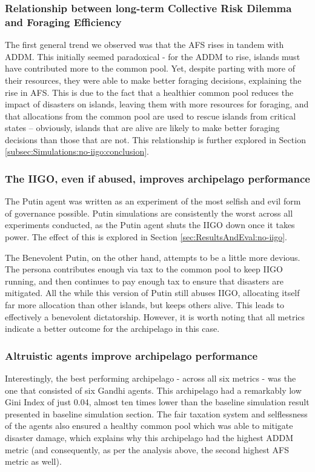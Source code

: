 \subsubsection{Relationship between long-term Collective Risk Dilemma and Foraging Efficiency}
The first general trend we observed was that the AFS rises in tandem with ADDM. This initially seemed paradoxical - for the ADDM to rise, islands must have contributed more to the common pool. Yet, despite parting with more of their resources, they were able to make better foraging decisions, explaining the rise in AFS. This is due to the fact that a healthier common pool reduces the impact of disasters on islands, leaving them with more resources for foraging, and that allocations from the common pool are used to rescue islands from critical states -- obviously, islands that are alive are likely to make better foraging decisions than those that are not. This relationship is further explored in Section \ref{subsec:Simulations:no-iigo:conclusion}.

\subsubsection{The IIGO, even if abused, improves archipelago performance}
The Putin agent was written as an experiment of the most selfish and evil form of governance possible. Putin simulations are consistently the worst across all experiments conducted, as the Putin agent shuts the IIGO down once it takes power. The effect of this is explored in Section \ref{sec:ResultsAndEval:no-iigo}. 

The Benevolent Putin, on the other hand, attempts to be a little more devious. The persona contributes enough via tax to the common pool to keep IIGO running, and then continues to pay enough tax to ensure that disasters are mitigated. All the while this version of Putin still abuses IIGO, allocating itself far more allocation than other islands, but keeps others alive. This leads to effectively a benevolent dictatorship. However, it is worth noting that all metrics indicate a better outcome for the archipelago in this case.

\subsubsection{Altruistic agents improve archipelago performance}

Interestingly, the best performing archipelago - across all six metrics - was the one that consisted of six Gandhi agents. This archipelago had a remarkably low Gini Index of just 0.04, almost ten times lower than the baseline simulation result presented in baseline simulation section. The fair taxation system and selflessness of the agents also ensured a healthy common pool which was able to mitigate disaster damage, which explains why this archipelago had the highest ADDM metric (and consequently, as per the analysis above, the second highest AFS metric as well).

